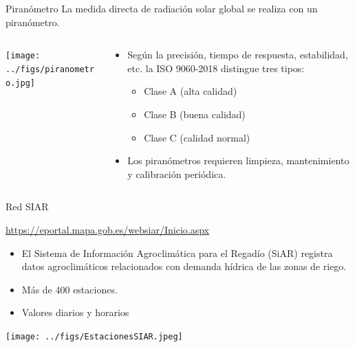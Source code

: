 \documentclass[aspectratio=169, usenames,svgnames,dvipsnames]{beamer}
\begin{document}
\begin{frame}[label={sec:org2975e7f}]{Piranómetro}
La medida directa de radiación solar global se realiza con un piranómetro.
\begin{columns}
\begin{column}{0.4\columnwidth}
\begin{center}
\begin{center}
\texttt{[image: ../figs/piranometro.jpg]}
\end{center}
\end{center}
\end{column}
\begin{column}{0.6\columnwidth}
\begin{itemize}
\item Según la precisión, tiempo de respuesta, estabilidad, etc. la ISO 9060-2018 distingue tres tipos:
\begin{itemize}
\item Clase A (alta calidad)
\item Clase B (buena calidad)
\item Clase C (calidad normal)
\end{itemize}
\item Los piranómetros requieren limpieza, mantenimiento y calibración periódica.
\end{itemize}
\end{column}
\end{columns}
\end{frame}
\begin{frame}[label={sec:orgb9e7894}]{Red SIAR}
\begin{block}{\url{https://eportal.mapa.gob.es/websiar/Inicio.aspx}}
\begin{itemize}
\item El Sistema de Información Agroclimática para el Regadío (SiAR)
registra datos agroclimáticos relacionados con demanda hídrica de
las zonas de riego.

\item Más de 400 estaciones.

\item Valores diarios y horarios
\end{itemize}

\begin{center}
\begin{center}
\texttt{[image: ../figs/EstacionesSIAR.jpeg]}
\end{center}
\end{center}
\end{block}
\end{frame}
\end{document}
